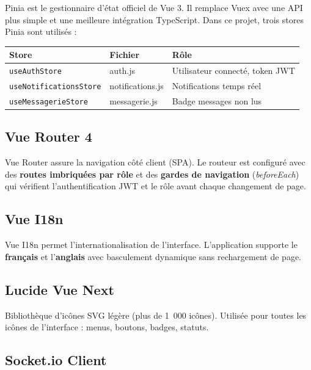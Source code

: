 \documentclass[12pt, a4paper]{report}
\begin{document}
Pinia est le gestionnaire d'état officiel de Vue 3. Il remplace Vuex avec
une API plus simple et une meilleure intégration TypeScript. Dans ce projet,
trois stores Pinia sont utilisés :

\begin{center}
\begin{tabular}{lll}
  \toprule
  \textbf{Store} & \textbf{Fichier} & \textbf{Rôle} \\
  \midrule
  \texttt{useAuthStore}          & auth.js          & Utilisateur connecté, token JWT \\
  \texttt{useNotificationsStore} & notifications.js & Notifications temps réel \\
  \texttt{useMessagerieStore}    & messagerie.js    & Badge messages non lus \\
  \bottomrule
\end{tabular}
\end{center}

\subsection{Vue Router 4}

Vue Router assure la navigation côté client (SPA). Le routeur est configuré
avec des \textbf{routes imbriquées par rôle} et des \textbf{gardes de navigation}
(\textit{beforeEach}) qui vérifient l'authentification JWT et le rôle avant
chaque changement de page.

\subsection{Vue I18n}

Vue I18n permet l'internationalisation de l'interface. L'application supporte
le \textbf{français} et l'\textbf{anglais} avec basculement dynamique sans
rechargement de page.

\subsection{Lucide Vue Next}

Bibliothèque d'icônes SVG légère (plus de 1~000 icônes). Utilisée pour toutes
les icônes de l'interface : menus, boutons, badges, statuts.

\subsection{Socket.io Client}
\end{document}
